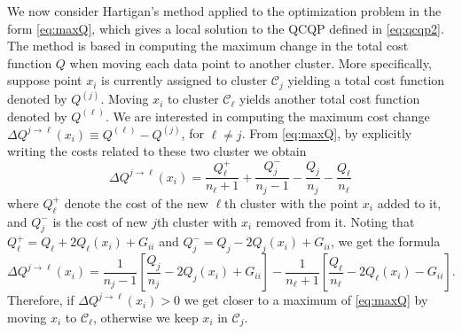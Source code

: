 \documentclass[aps,preprint,nofootinbib,floatfix]{revtex4-1}
\newcommand\C{{\mathcal{C}}}
\begin{document}
We now consider Hartigan's method \cite{Hartigan} 
applied to the optimization problem in the form \eqref{eq:maxQ}, which gives
a local solution to the QCQP defined in \eqref{eq:qcqp2}. 
The method is based in computing the maximum change
in the total cost function $Q$ when moving each data point to
another cluster. More specifically, 
suppose point $x_i$
is currently assigned to  cluster $\C_j$ yielding
a total cost function denoted by $Q^{(j)}$.
Moving $x_i$ to cluster $\C_\ell$ yields another total cost function
denoted by $Q^{(\ell)}$. We are interested in computing the maximum 
cost change
$\Delta Q^{j\to \ell} (x_i) \equiv Q^{(\ell)} - Q^{(j)}$, for $\ell\ne j$. 
From \eqref{eq:maxQ}, by explicitly writing the costs related to these 
two cluster we obtain
\begin{equation}
\Delta Q^{j\to \ell} (x_i) = \dfrac{Q_\ell^{+}}{n_\ell+1} + 
\dfrac{Q_j^-}{n_j-1} - \dfrac{Q_j}{n_j} - \dfrac{Q_\ell}{n_\ell}
\end{equation}
where $Q^{+}_\ell$ denote the cost of the new $\ell$th cluster
with the point $x_i$ added to it, and $Q^-_j$ is the cost of new 
$j$th cluster with $x_i$ removed from it. Noting that 
$Q_\ell^{+} = Q_\ell + 2 Q_\ell(x_i) + G_{ii}$ and
$Q_j^{-} = Q_j - 2 Q_j(x_i) + G_{ii}$, we get the formula
\begin{equation}
\label{eq:changeQ}
\Delta Q^{j \to \ell}(x_i)  = 
\dfrac{1}{n_j - 1}\left[ \dfrac{Q_j}{n_j} - 2 Q_j(x_i) + G_{ii} \right]
- \dfrac{1}{n_\ell + 1}\left[ \dfrac{Q_\ell}{n_\ell} - 2 Q_\ell(x_i) 
- G_{ii} \right].
\end{equation}
Therefore, if $\Delta Q^{j\to \ell}(x_i) > 0$ we get closer to a 
maximum of \eqref{eq:maxQ} by
moving $x_i$ to $\C_\ell$, otherwise we keep $x_i$ in $\C_j$. 
\end{document}
